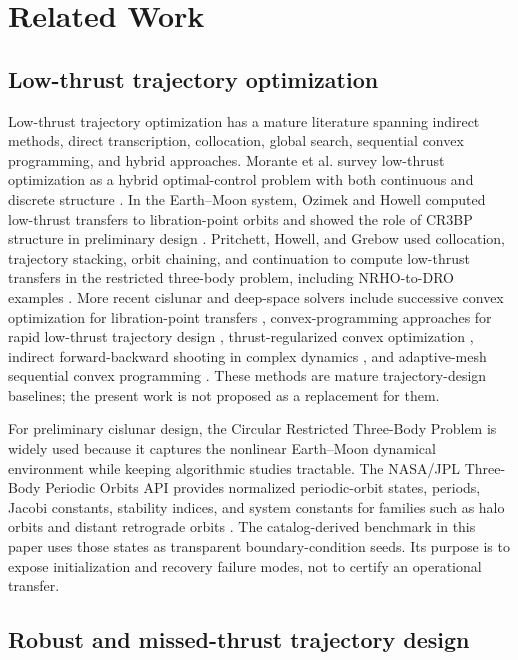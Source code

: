 \documentclass[preprint,12pt]{elsarticle}
\begin{document}
\section{Related Work}

\subsection{Low-thrust trajectory optimization}

Low-thrust trajectory optimization has a mature literature spanning indirect methods, direct transcription, collocation, global search, sequential convex programming, and hybrid approaches. Morante et al. survey low-thrust optimization as a hybrid optimal-control problem with both continuous and discrete structure \cite{morante2021survey}. In the Earth--Moon system, Ozimek and Howell computed low-thrust transfers to libration-point orbits and showed the role of CR3BP structure in preliminary design \cite{ozimek2010low}. Pritchett, Howell, and Grebow used collocation, trajectory stacking, orbit chaining, and continuation to compute low-thrust transfers in the restricted three-body problem, including NRHO-to-DRO examples \cite{pritchett2017collocation}. More recent cislunar and deep-space solvers include successive convex optimization for libration-point transfers \cite{kayama2022successive}, convex-programming approaches for rapid low-thrust trajectory design \cite{hofmann2021rapid}, thrust-regularized convex optimization \cite{morelli2024regularization}, indirect forward-backward shooting in complex dynamics \cite{sidhoum2024indirect}, and adaptive-mesh sequential convex programming \cite{kumagai2024adaptive}. These methods are mature trajectory-design baselines; the present work is not proposed as a replacement for them.

For preliminary cislunar design, the Circular Restricted Three-Body Problem is widely used because it captures the nonlinear Earth--Moon dynamical environment while keeping algorithmic studies tractable. The NASA/JPL Three-Body Periodic Orbits API provides normalized periodic-orbit states, periods, Jacobi constants, stability indices, and system constants for families such as halo orbits and distant retrograde orbits \cite{jplPeriodicOrbits}. The catalog-derived benchmark in this paper uses those states as transparent boundary-condition seeds. Its purpose is to expose initialization and recovery failure modes, not to certify an operational transfer.

\subsection{Robust and missed-thrust trajectory design}
\end{document}
